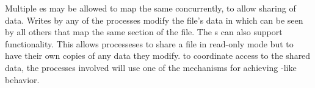 Multiple es may be allowed to map the same  concurrently, to allow sharing of data.
Writes by any of the processes modify the file's data in  which can be seen by all others that map the same section of the file.
The  s can also support  functionality.
This allows processeses to share a file in read-only mode but to have their own copies of any data they modify.
to coordinate access to the shared data, the processes involved will use one of the mechanisms for achieving -like behavior.



